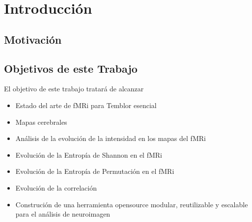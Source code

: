 \chapter{Introducción}

\section{Motivación}



\section{Objetivos de este Trabajo}

El objetivo de este trabajo tratará de alcanzar

\begin{itemize}
\item Estado del arte de fMRi para Temblor esencial
\item Mapas cerebrales
\item Análisis de la evolución de la intensidad en los mapas del fMRi
\item Evolución de la Entropía de Shannon en el fMRi
\item Evolución de la Entropía de Permutación en el fMRi
\item Evolución de la correlación
\item Construción de una herramienta opensource modular, reutilizable y escalable para el análisis de neuroimagen
\end{itemize}


